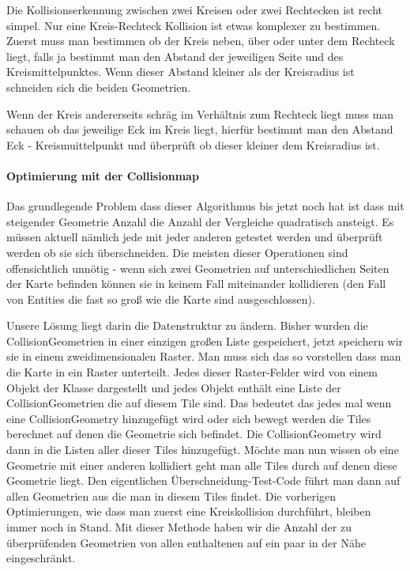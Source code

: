 Die Kollisionserkennung zwischen zwei Kreisen oder zwei Rechtecken ist recht simpel. Nur eine Kreis-Rechteck Kollision ist etwas komplexer zu bestimmen.
Zuerst muss man bestimmen ob der Kreis neben, über oder unter dem Rechteck liegt, falls ja bestimmt man den Abstand der jeweiligen Seite und des Kreismittelpunktes. Wenn dieser Abstand kleiner als der Kreisradius ist schneiden sich die beiden Geometrien.


Wenn der Kreis andererseits schräg im Verhältnis zum Rechteck liegt muss man schauen ob das jeweilige Eck im Kreis liegt, hierfür bestimmt man den Abstand Eck - Kreismuittelpunkt und überprüft ob dieser kleiner dem Kreisradius ist.


\paragraph{Optimierung mit der Collisionmap}

Das grundlegende Problem dass dieser Algorithmus bis jetzt noch hat ist dass mit steigender Geometrie Anzahl die Anzahl der Vergleiche quadratisch ansteigt. 
Es müssen aktuell nämlich jede  mit jeder anderen getestet werden und überprüft werden ob sie sich überschneiden.
Die meisten dieser Operationen sind offensichtlich unnötig - wenn sich zwei Geometrien auf unterschiedlichen Seiten der Karte befinden können sie in keinem Fall miteinander kollidieren (den Fall von Entities die fast so groß wie die Karte sind ausgeschlossen).

Unsere Lösung liegt darin die Datenstruktur zu ändern. Bisher wurden die CollisionGeometrien in einer einzigen großen Liste gespeichert, jetzt speichern wir sie in einem zweidimensionalen Raster.
Man muss sich das so vorstellen dass man die Karte in ein Raster unterteilt. Jedes dieser Raster-Felder wird von einem Objekt der Klasse  dargestellt und jedes Objekt enthält eine Liste der CollisionGeometrien die auf diesem Tile sind.
Das bedeutet das jedes mal wenn eine CollisionGeometry hinzugefügt wird oder sich bewegt werden die Tiles berechnet auf denen die Geometrie sich befindet. Die CollisionGeometry wird dann in die Listen aller dieser Tiles hinzugefügt. Möchte man nun wissen ob eine Geometrie mit einer anderen kollidiert geht man alle Tiles durch auf denen diese Geometrie liegt. Den eigentlichen Überschneidung-Test-Code führt man dann auf allen Geometrien aus die man in diesem Tiles findet. Die vorherigen Optimierungen, wie dass man zuerst eine Kreiskollision durchführt, bleiben immer noch in Stand. Mit dieser Methode haben wir die Anzahl der zu überprüfenden Geometrien von allen enthaltenen auf ein paar in der Nähe eingeschränkt.

